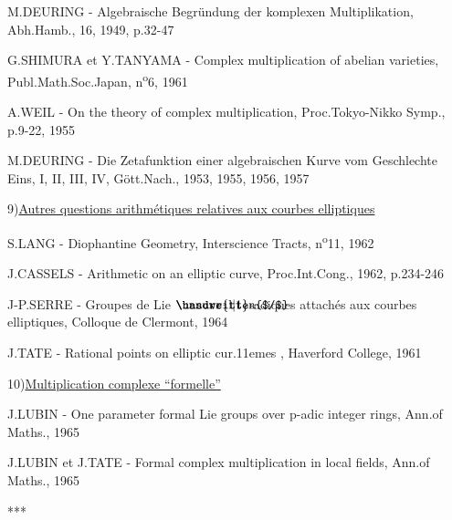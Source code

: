 M.DEURING - Algebraische Begründung der komplexen Multiplikation, Abh.Hamb., 16, 1949, p.32-47

\reversemarginpar
{}
G.SHIMURA et Y.TANYAMA - Complex multiplication of abelian varieties, Publ.Math.Soc.Japan, n\textsuperscript{o}6, 1961

A.WEIL - On the theory of complex multiplication, Proc.Tokyo-Nikko Symp., p.9-22, 1955

M.DEURING - Die Zetafunktion einer algebraischen Kurve vom Geschlechte Eins, I, II, III, IV, Gött.Nach., 1953, 1955, 1956, 1957

9)\quad \uline{Autres questions arithmétiques relatives aux courbes elliptiques}

S.LANG - Diophantine Geometry, Interscience Tracts, n\textsuperscript{o}11, 1962

J.CASSELS - Arithmetic on an elliptic curve, Proc.Int.Cong., 1962, p.234-246

J-P.SERRE - Groupes de Lie $\mathord{\rlap{\handwritten{$/$}}\unsure{\mathrm{l}|1}}$-adiques attachés aux courbes elliptiques, Colloque de Clermont, 1964

J.TATE - Rational points on elliptic cur\kern.11emes , Haverford College, 1961

10)\quad \uline{Multiplication complexe ``formelle''}

J.LUBIN - One parameter formal Lie groups over $\mathrm{p}$-adic integer rings, Ann.of Maths., 1965

J.LUBIN et J.TATE - Formal complex multiplication in local fields, Ann.of Maths., 1965

\begin{center}
***
\end{center}
\normalmarginpar
